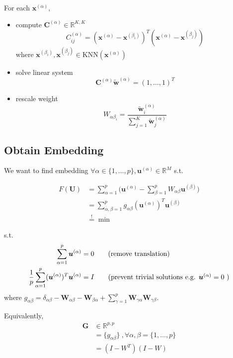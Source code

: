 For each $\boldsymbol{x}^{(\alpha)}$, 
\begin{itemize}
	\item compute $\boldsymbol{C}^{(\alpha)} \in \mathbb{R}^{K,K}$
	$$
	C^{(\alpha)}_{ij}  =  (\boldsymbol{x}^{(\alpha)} - \boldsymbol{x}^{(\beta_i)})^T(\boldsymbol{x}^{(\alpha)} - \boldsymbol{x}^{(\beta_j)})
	$$
	where $\boldsymbol{x}^{(\beta_i)}, \boldsymbol{x}^{(\beta_j)} \in \text{KNN}(\boldsymbol{x}^{(\alpha)})$
	\item solve linear system
	$$
	\boldsymbol{C}^{(\alpha)} \boldsymbol{\widetilde{w}}^{(\alpha)} = (1,\dots,1)^T
	$$
	\item rescale weight 
	$$W_{\alpha\beta_i} = \frac{ \boldsymbol{\widetilde{w}}_i^{(\alpha)}}{\sum_{j=1}^{K} \boldsymbol{\widetilde{w}}_j^{(\alpha)}} $$
\end{itemize}

\subsection{Obtain Embedding}
We want to find embedding $\forall \alpha \in \{1, \dots, p \}, \boldsymbol{u}^{(\alpha)} \in \mathbb{R}^{M}$ s.t. 

\begin{align*}
	F(\boldsymbol{U}) &= \sum_{\alpha=1}^p \bigg ( \boldsymbol{u}^{(\alpha)} - \sum_{\beta=1}^{p} W_{\alpha\beta} \boldsymbol{u}^{(\beta)} \bigg ) \\
	&= \sum_{\alpha, \beta=1}^p g_{\alpha\beta} (\boldsymbol{u}^{(\alpha)})^T \boldsymbol{u}^{(\beta)} \\
	&\stackrel{!}{=} \min 
\end{align*}

s.t.
\begin{align*}
	\sum_{\alpha=1}^{p} \boldsymbol{u}^{(\alpha)} &= 0 \tag*{(remove translation)} \\
	\frac{1}{p} \sum_{\alpha=1}^{p} (\boldsymbol{u}^{(\alpha)})^T \boldsymbol{u}^{(\alpha)} &= I \tag*{(prevent trivial solutions e.g. $\boldsymbol{u}^{(\alpha)} = 0$ )}
\end{align*}
where $g_{\alpha\beta} = \delta_{\alpha\beta} - \boldsymbol{W}_{\alpha\beta} - \boldsymbol{W}_{\beta\alpha} + \sum_{\gamma=1}^{p} \boldsymbol{W}_{\gamma\alpha} \boldsymbol{W}_{\gamma\beta}$. 

Equivalently,
\begin{align*}
	\boldsymbol{G} &\in \mathbb{R}^{p,p} \\
	&= \{ g_{\alpha\beta} \} \ , \forall \alpha,\beta = \{1,\dots,p\} \\
	&= (I - W^T) (I-W)
\end{align*}

